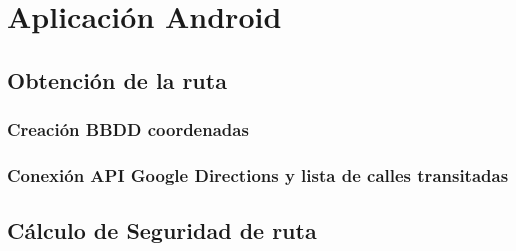 \chapter{Aplicación Android}



\section{Obtención de la ruta}

\subsection{Creación BBDD coordenadas}

\subsection{Conexión API Google Directions y lista de calles transitadas}


\section{Cálculo de Seguridad de ruta}

